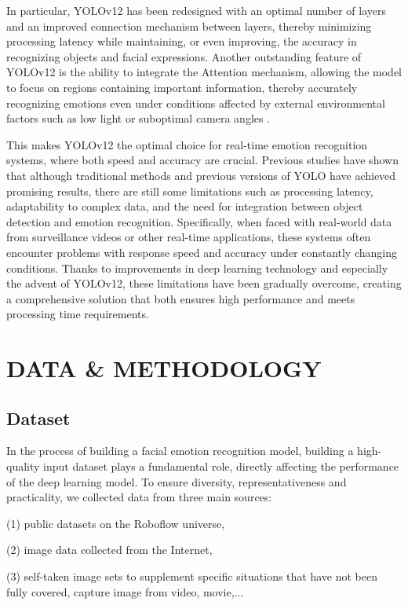 \documentclass[a4paper,13pt]{report}
\begin{document}
In particular, YOLOv12 has been redesigned with an optimal number of layers and an improved connection mechanism between layers, thereby minimizing processing latency while maintaining, or even improving, the accuracy in recognizing objects and facial expressions. Another outstanding feature of YOLOv12 is the ability to integrate the Attention mechanism, allowing the model to focus on regions containing important information, thereby accurately recognizing emotions even under conditions affected by external environmental factors such as low light or suboptimal camera angles \cite{tian2025}. 

This makes YOLOv12 the optimal choice for real-time emotion recognition systems, where both speed and accuracy are crucial. Previous studies have shown that although traditional methods and previous versions of YOLO have achieved promising results, there are still some limitations such as processing latency, adaptability to complex data, and the need for integration between object detection and emotion recognition. Specifically, when faced with real-world data from surveillance videos or other real-time applications, these systems often encounter problems with response speed and accuracy under constantly changing conditions. Thanks to improvements in deep learning technology and especially the advent of YOLOv12, these limitations have been gradually overcome, creating a comprehensive solution that both ensures high performance and meets processing time requirements.


\clearpage
\chapter{DATA \& METHODOLOGY}

\section{Dataset}
In the process of building a facial emotion recognition model, building a high-quality input dataset plays a fundamental role, directly affecting the performance of the deep learning model. To ensure diversity, representativeness and practicality, we collected data from three main sources:

(1) public datasets on the Roboflow universe,

(2) image data collected from the Internet,

(3) self-taken image sets to supplement specific situations that have not been fully covered, capture image from video, movie,...
\end{document}
